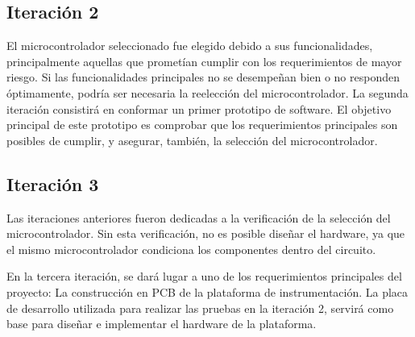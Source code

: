 \subsection{Iteración 2} %
\label{sub:iteracion_2}

El microcontrolador seleccionado fue elegido debido a sus funcionalidades, principalmente aquellas que prometían cumplir con los requerimientos de mayor riesgo. Si las funcionalidades principales no se desempeñan bien o no responden óptimamente, podría ser necesaria la reelección del microcontrolador. La segunda iteración consistirá en conformar un primer prototipo de software. El objetivo principal de este prototipo es comprobar que los requerimientos principales son posibles de cumplir, y asegurar, también, la selección del microcontrolador.


\subsection{Iteración 3} %
\label{sub:iteracion_3}

Las iteraciones anteriores fueron dedicadas a la verificación de la selección del microcontrolador. Sin esta verificación, no es posible diseñar el hardware, ya que el mismo microcontrolador condiciona los componentes dentro del circuito.

En la tercera iteración, se dará lugar a uno de los requerimientos principales del proyecto: La construcción en PCB de la plataforma de instrumentación. La placa de desarrollo utilizada para realizar las pruebas en la iteración 2, servirá como base para diseñar e implementar el hardware de la plataforma.



